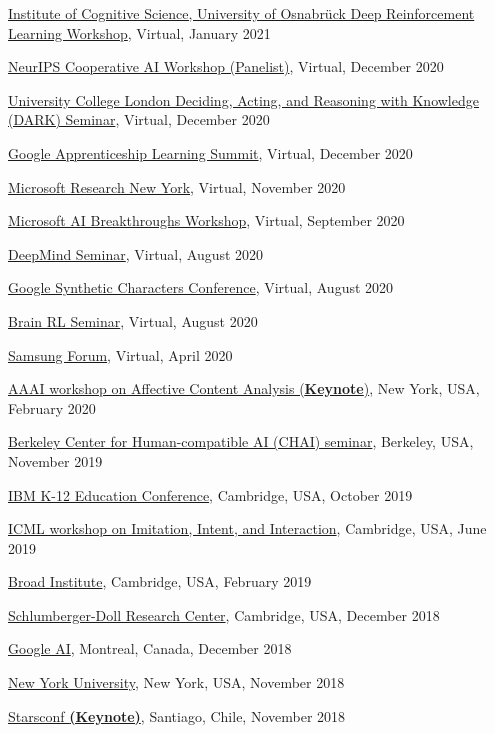 \documentclass[paper=letter,fontsize=11pt]{scrartcl} %
\newcommand{\TalkEntry}[4]{
		\noindent \href{#4}{#1}, #2, #3 }
\begin{document}
\begin{etaremune}
\item\TalkEntry{Institute of Cognitive Science, University of Osnabrück Deep Reinforcement Learning Workshop}{Virtual}{January 2021}{https://www.youtube.com/watch?list=PLlVUF9l2EowbdI05VOaMp73p-TtZjQW7A&v=G__GZKNhvsU&feature=emb_logo}
\item\TalkEntry{NeurIPS Cooperative AI Workshop (Panelist)}{Virtual}{December 2020}{https://www.cooperativeai.com/neurips-2020/speakers}
\item\TalkEntry{University College London Deciding, Acting, and Reasoning with Knowledge (DARK) Seminar}{Virtual}{December 2020}{https://www.youtube.com/watch?v=traKBhJm4lQ&feature=youtu.be}
\item\TalkEntry{Google Apprenticeship Learning Summit}{Virtual}{December 2020}{https://sites.google.com/corp/google.com/alsummit2020}
\item\TalkEntry{Microsoft Research New York}{Virtual}{November 2020}{}
\item\TalkEntry{Microsoft AI Breakthroughs Workshop}{Virtual}{September 2020}{https://www.microsoft.com/en-us/research/event/ai-breakthroughs-2020/#!agenda}
\item\TalkEntry{DeepMind Seminar}{Virtual}{August 2020}{}
\item\TalkEntry{Google Synthetic Characters Conference}{Virtual}{August 2020}{https://sites.google.com/corp/google.com/sc2020/schedule-agenda?authuser=0} 
\item\TalkEntry{Brain RL Seminar}{Virtual}{August 2020}{} 
\item\TalkEntry{Samsung Forum}{Virtual}{April 2020}{https://www.samsung.com/us/ssic/session/towards-social-and-affective-machine-learning/} 
\item\TalkEntry{AAAI workshop on Affective Content Analysis (\textbf{Keynote})}{New York, USA}{February 2020}{https://sites.google.com/corp/view/affcon2020/invited-speakers} 
\item\TalkEntry{Berkeley Center for Human-compatible AI (CHAI) seminar}{Berkeley, USA}{November 2019}{} 
\item\TalkEntry{IBM K-12 Education Conference}{Cambridge, USA}{October 2019}{} 
\item\TalkEntry{ICML workshop on Imitation, Intent, and Interaction}{Cambridge, USA}{June 2019}{https://slideslive.com/38917621/social-learning-from-agents-and-humans} 
\item\TalkEntry{Broad Institute}{Cambridge, USA}{February 2019}{https://www.youtube.com/watch?v=Vx5Daxa0Yts} 
\item\TalkEntry{Schlumberger-Doll Research Center}{Cambridge, USA}{December 2018}{} 
\item\TalkEntry{Google AI}{Montreal, Canada}{December 2018}{} 
\item\TalkEntry{New York University}{New York, USA}{November 2018}{} 
\item\TalkEntry{Starsconf \textbf{(Keynote)}}{Santiago, Chile}{November 2018}{https://www.youtube.com/watch?v=QI5Gvn8FDG0} 


\end{etaremune}
\end{document}
